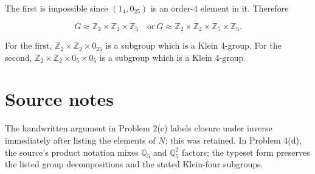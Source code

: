 The first is impossible since \(\left( {1_{4},0_{25}} \right)\) is an order-\(4\) element in it. Therefore

\[G \approx \mathbb{Z}_{2} \times \mathbb{Z}_{2} \times \mathbb{Z}_{5}\quad\text{or}\ G \approx \mathbb{Z}_{2} \times \mathbb{Z}_{2} \times \mathbb{Z}_{5} \times \mathbb{Z}_{5}.\]

For the first, \(\mathbb{Z}_{2} \times \mathbb{Z}_{2} \times 0_{25}\) is a subgroup which is a Klein 4-group. For the second, \(\mathbb{Z}_{2} \times \mathbb{Z}_{2} \times 0_{5} \times 0_{5}\) is a subgroup which is a Klein 4-group.

\section{Source notes}

The handwritten argument in Problem 2(c) labels closure under inverse immediately after listing the elements of \(N\); this was retained. In Problem 4(d), the source's product notation mixes \(\mathbb{Q}_{5}\) and \(\mathbb{Q}_{5}^{2}\) factors; the typeset form preserves the listed group decompositions and the stated Klein-four subgroups.
